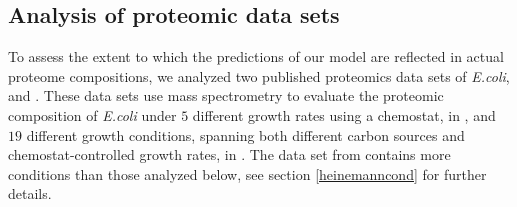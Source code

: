 \subsection{Analysis of proteomic data sets}
To assess the extent to which the predictions of our model are reflected in actual proteome compositions, we analyzed two published proteomics data sets of \emph{E.coli}, \cite{Valgepea2013} and \cite{Heinemann2015}.
These data sets use mass spectrometry to evaluate the proteomic composition of \emph{E.coli} under $5$ different growth rates using a chemostat, in \cite{Valgepea2013}, and $19$ different growth conditions, spanning both different carbon sources and chemostat-controlled growth rates, in \cite{Heinemann2015}.
The data set from \cite{Heinemann2015} contains more conditions than those analyzed below, see section \ref{heinemanncond} for further details.